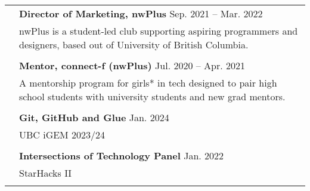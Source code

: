 \documentclass[letterpaper, 11pt]{article}
\begin{document}
\begin{longtable}{p{1.3in}p{4.8in}}
	 & \textbf{Director of Marketing, nwPlus} \hfill Sep. 2021 -- Mar. 2022                                                                                                                                   \\
	 & nwPlus is a student-led club supporting aspiring programmers and designers, based out of University of British Columbia.                                                                               \\
	 &                                                                                                                                                                                                        \\

	 & \textbf{Mentor, connect-f (nwPlus)} \hfill Jul. 2020 -- Apr. 2021                                                                                                                                      \\
	 & A mentorship program for girls* in tech designed to pair high school students with university students and new grad mentors.                                                                           \\
	 &                                                                                                                                                                                                        \\

	{\color{Blue}{Talks and tutorials}}
	 & \textbf{Git, GitHub and Glue} \hfill Jan. 2024                                                                                                                                                         \\
	 & UBC iGEM 2023/24                                                                                                                                                                                       \\
	 &                                                                                                                                                                                                        \\

	 & \textbf{Intersections of Technology Panel} \hfill Jan. 2022                                                                                                                                            \\
	 & StarHacks II                                                                                                                                                                                           \\
	 &                                                                                                                                                                                                        \\


\end{longtable}
\end{document}
